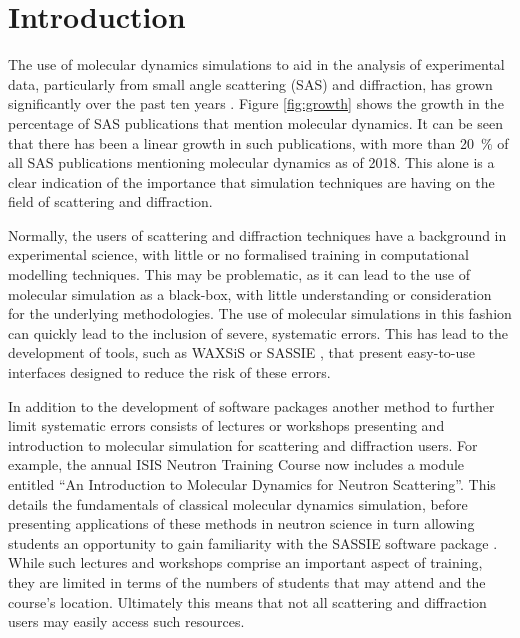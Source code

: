 \documentclass[amsmath,amssymb,twocolumn,superscriptaddress]{revtex4-1}
\begin{document}
\section{Introduction}

\noindent The use of molecular dynamics simulations to aid in the analysis of experimental data, particularly from small angle scattering (SAS) and diffraction, has grown significantly over the past ten years \cite{Pan2012,Boldon2015,Hub2018,Ivanovic2018,East2016,Wall2014,Wall2018,Satoh2015}.
Figure \ref{fig:growth} shows the growth in the percentage of SAS publications that mention molecular dynamics.
It can be seen that there has been a linear growth in such publications, with more than \SI{20}{\percent} of all SAS publications mentioning molecular dynamics as of 2018.
This alone is a clear indication of the importance that simulation techniques are having on the field of scattering and diffraction.

Normally, the users of scattering and diffraction techniques have a background in experimental science, with little or no formalised training in computational modelling techniques.
This may be problematic, as it can lead to the use of molecular simulation as a black-box, with little understanding or consideration for the underlying methodologies.
The use of molecular simulations in this fashion can quickly lead to the inclusion of severe, systematic errors.
This has lead to the development of tools, such as WAXSiS or SASSIE \cite{Chen2014,Knight2015,Perkins2016}, that present easy-to-use interfaces designed to reduce the risk of these errors.

In addition to the development of software packages another method to further limit systematic errors consists of lectures or workshops presenting and introduction to molecular simulation for scattering and diffraction users.
For example, the annual ISIS Neutron Training Course now includes a module entitled ``An Introduction to Molecular Dynamics for Neutron Scattering''.
This details the fundamentals of classical molecular dynamics simulation, before presenting applications of these methods in neutron science in turn allowing students an opportunity to gain familiarity with the SASSIE software package \cite{Perkins2016}.
While such lectures and workshops comprise an important aspect of training, they are limited in terms of the numbers of students that may attend and the course's location.
Ultimately this means that not all scattering and diffraction users may easily access such resources.
\end{document}
